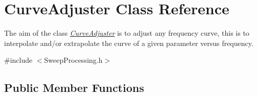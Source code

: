 \hypertarget{classCurveAdjuster}{}\section{Curve\+Adjuster Class Reference}
\label{classCurveAdjuster}


The aim of the class {\itshape \hyperlink{classCurveAdjuster}{Curve\+Adjuster}} is to adjust any frequency curve, this is to interpolate and/or extrapolate the curve of a given parameter versus frequency.  




{\ttfamily \#include $<$Sweep\+Processing.\+h$>$}

\subsection*{Public Member Functions}
